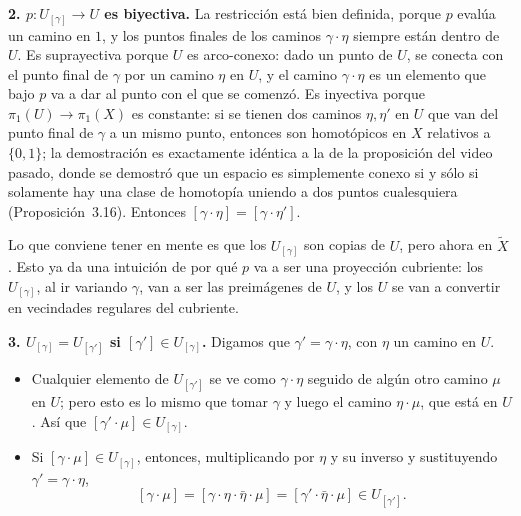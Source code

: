 \documentclass[11pt]{article}
\begin{document}
\medskip\noindent\textbf{2. $p\colon U_{[\gamma]}\to U$ es biyectiva.} La restricción está bien definida, porque $p$ evalúa un camino en $1$, y los puntos finales de los caminos $\gamma\cdot\eta$ siempre están dentro de $U$. Es suprayectiva porque $U$ es arco-conexo: dado un punto de $U$, se conecta con el punto final de $\gamma$ por un camino $\eta$ en $U$, y el camino $\gamma\cdot\eta$ es un elemento que bajo $p$ va a dar al punto con el que se comenzó. Es inyectiva porque $\pi_1(U)\to\pi_1(X)$ es constante: si se tienen dos caminos $\eta,\eta'$ en $U$ que van del punto final de $\gamma$ a un mismo punto, entonces son homotópicos en $X$ relativos a $\{0,1\}$; la demostración es exactamente idéntica a la de la proposición del video pasado, donde se demostró que un espacio es simplemente conexo si y sólo si solamente hay una clase de homotopía uniendo a dos puntos cualesquiera (Proposición~3.16). Entonces $[\gamma\cdot\eta]=[\gamma\cdot\eta']$.

Lo que conviene tener en mente es que los $U_{[\gamma]}$ son copias de $U$, pero ahora en $\tilde X$. Esto ya da una intuición de por qué $p$ va a ser una proyección cubriente: los $U_{[\gamma]}$, al ir variando $\gamma$, van a ser las preimágenes de $U$, y los $U$ se van a convertir en vecindades regulares del cubriente.

\medskip\noindent\textbf{3. $U_{[\gamma]}=U_{[\gamma']}$ si $[\gamma']\in U_{[\gamma]}$.} Digamos que $\gamma'=\gamma\cdot\eta$, con $\eta$ un camino en $U$.
\begin{itemize}
  \item[($\supseteq$)] Cualquier elemento de $U_{[\gamma']}$ se ve como $\gamma\cdot\eta$ seguido de algún otro camino $\mu$ en $U$; pero esto es lo mismo que tomar $\gamma$ y luego el camino $\eta\cdot\mu$, que está en $U$. Así que $[\gamma'\cdot\mu]\in U_{[\gamma]}$.
  \item[($\subseteq$)] Si $[\gamma\cdot\mu]\in U_{[\gamma]}$, entonces, multiplicando por $\eta$ y su inverso y sustituyendo $\gamma'=\gamma\cdot\eta$,
  \[
    [\gamma\cdot\mu]=[\gamma\cdot\eta\cdot\bar\eta\cdot\mu]=[\gamma'\cdot\bar\eta\cdot\mu]\in U_{[\gamma']} .
  \]
\end{itemize}
\end{document}
